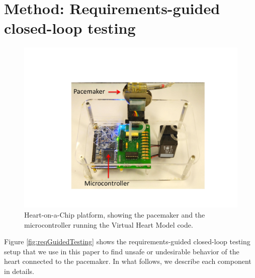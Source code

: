 \section{Method: Requirements-guided closed-loop testing}
\label{method}

\begin{figure}[!t]
	\centering
	\includegraphics[scale=0.3]{figures/HOCannotated.pdf}		
	\caption{\small Heart-on-a-Chip platform, showing the pacemaker and the microcontroller running the Virtual Heart Model code.}
	\label{fig:hoc}
\end{figure} 

Figure \ref{fig:reqGuidedTesting} shows the requirements-guided closed-loop testing setup that we use in this paper to find unsafe or undesirable behavior of the heart connected to the pacemaker.
In what follows, we describe each component in details.





